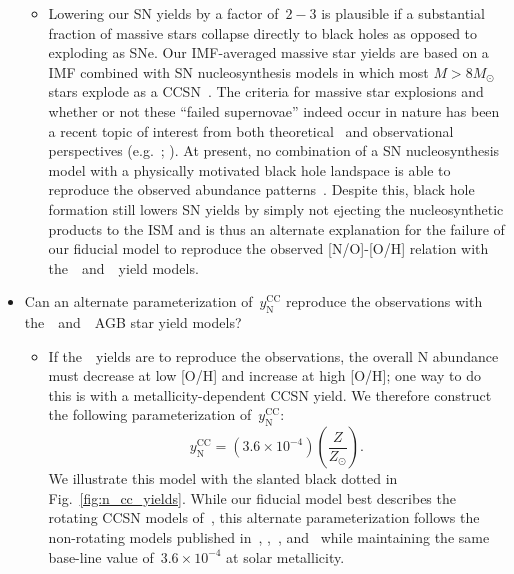 \documentclass[ms.tex]{subfiles}
\begin{document}
\begin{itemize}
\begin{itemize}
		\item Lowering our SN yields by a factor of~$2-3$ is plausible if a
		substantial fraction of massive stars collapse directly to black holes
		as opposed to exploding as SNe.
		Our IMF-averaged massive star yields are based on a~\citet{Kroupa2001}
		IMF combined with SN nucleosynthesis models in which most
		$M > 8 M_\odot$ stars explode as a CCSN~\citep[e.g.][]{Woosley1995,
		Chieffi2004, Chieffi2013, Limongi2006, Nomoto2013}.
		The criteria for massive star explosions and whether or not these 
		``failed supernovae'' indeed occur in nature has been a recent topic of
		interest from both theoretical~\citep[e.g.][]{Pejcha2015, Sukhbold2016,
		Ertl2016} and observational perspectives (e.g.~\citealp*{Gerke2015};
		\citealp{Adams2017, Basinger2021}).
		At present, no combination of a SN nucleosynthesis model with a
		physically motivated black hole landspace is able to reproduce the
		observed abundance patterns~\citep{Griffith2021}.
		Despite this, black hole formation still lowers SN yields by simply
		not ejecting the nucleosynthetic products to the ISM and is thus an
		alternate explanation for the failure of our fiducial model to
		reproduce the observed [N/O]-[O/H] relation with
		the~\cristallo~and~\ventura~yield models.
	\end{itemize}

	\item Can an alternate parameterization of~$y_\text{N}^\text{CC}$ reproduce 
	the observations with the~\karakasten~and~\karakas~AGB star yield models? 
	\begin{itemize} 
		\item If the~\karakasten~yields are to reproduce the observations, the 
		overall N abundance must decrease at low [O/H] and increase at high 
		[O/H]; one way to do this is with a metallicity-dependent CCSN yield. 
		We therefore construct the following parameterization 
		of~$y_\text{N}^\text{CC}$: 
		\begin{equation} 
		y_\text{N}^\text{CC} = (3.6\times10^{-4})\left(\frac{Z}{Z_\odot}\right). 
		\label{eq:linear_yncc} 
		\end{equation} 
		We illustrate this model with the slanted black dotted in 
		Fig.~\ref{fig:n_cc_yields}. 
		While our fiducial model best describes the rotating CCSN models 
		of~\citet{Limongi2018}, this alternate parameterization follows the
		non-rotating models published in~\citet{Limongi2018},
		\citet{Sukhbold2016},~\citet{Nomoto2013}, and~\citet{Woosley1995} while 
		maintaining the same base-line value of~$3.6\times10^{-4}$ at solar 
		metallicity. 


\end{itemize}
\end{itemize}
\end{document}
